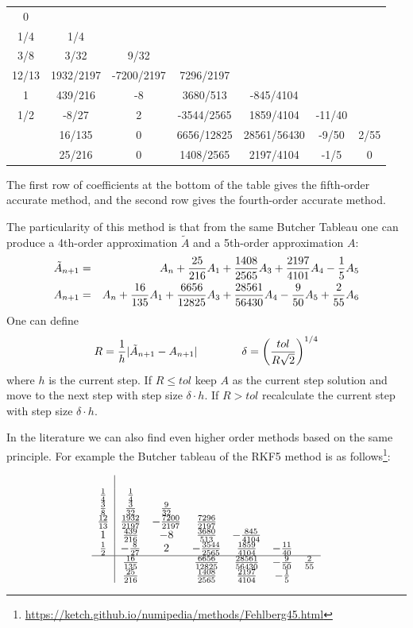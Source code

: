 \begin{mdframed}[backgroundcolor=blue!5]
\begin{tabular}{c|cccccc}
0 & \\
1/4 	&1/4\\ 
3/8 	&3/32 		&9/32 \\
12/13 	&1932/2197 	&-7200/2197 &	7296/2197\\
1 	&439/216 	&-8 	&3680/513 &	-845/4104\\
1/2 	&-8/27 		&2 	&-3544/2565& 	1859/4104 &	-11/40 	\\
\hline
&16/135 	&0 		&6656/12825 	&28561/56430 	&-9/50& 	2/55\\
&25/216 	&0 	&1408/2565 	&2197/4104 	&-1/5 	&0 
\end{tabular}
\end{mdframed}

The first row of coefficients at the bottom of the table gives the fifth-order 
accurate method, and the second row gives the fourth-order accurate method. 

The particularity of this method is that from the same Butcher Tableau one 
can produce a 4th-order approximation $\tilde{A}$ and a 5th-order approximation $A$:
\begin{eqnarray}
\tilde{A}_{n+1}&=&A_n + \frac{25}{216}A_1 + \frac{1408}{2565}A_3+\frac{2197}{4101}A_4 -\frac15 A_5 \nonumber\\
A_{n+1}&=&A_n + \frac{16}{135}A_1 + \frac{6656}{12825}A_3+\frac{28561}{56430}A_4 \nonumber
-\frac{9}{50} A_5 + \frac{2}{55} A_6
\end{eqnarray}
One can define 
\[
R=\frac{1}{h} | \tilde{A}_{n+1} - A_{n+1} | \nonumber\\
\qquad\qquad
\delta = \left( \frac{tol}{R \sqrt 2} \right)^{1/4}
\]
where $h$ is the current step.
If $R \le tol$ keep $A$ as the current step solution and move to the next step with step size $\delta  \cdot h$.
If $R > tol$ recalculate the current step with step size $\delta  \cdot h$. 

In the literature we can also find even higher order methods 
based on the same principle. 
For example the Butcher tableau of the RKF5 method is as 
follows\footnote{\url{https://ketch.github.io/numipedia/methods/Fehlberg45.html}}:

\[ 
\begin{array}{c|cccccc} 
& & & & & & \\ 
\frac{1}{4} & \frac{1}{4} & & & & & \\ 
\frac{3}{8} & \frac{3}{32} & \frac{9}{32} & & & & \\ 
\frac{12}{13} & \frac{1932}{2197} & - \frac{7200}{2197} & \frac{7296}{2197} & & & \\ 
1 & \frac{439}{216} & -8 & \frac{3680}{513} & - \frac{845}{4104} & & \\ 
\frac{1}{2} & - \frac{8}{27} & 2 & - \frac{3544}{2565} & \frac{1859}{4104} & - \frac{11}{40} & \\ 
\hline & \frac{16}{135} & & \frac{6656}{12825} & \frac{28561}{56430} & - \frac{9}{50} & \frac{2}{55}\\ 
& \frac{25}{216} & & \frac{1408}{2565} & \frac{2197}{4104} & - \frac{1}{5} & 
\end{array}
\]




